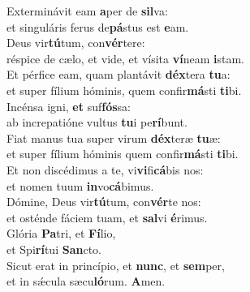 \evenverse Exterminávit eam \textbf{a}per de \textbf{sil}va:~\*\\
\evenverse et singuláris ferus de\textbf{pá}stus est \textbf{e}am.\\
\oddverse Deus vir\textbf{tú}tum, con\textbf{vér}tere:~\*\\
\oddverse réspice de cælo, et vide, et vísita \textbf{ví}neam \textbf{i}stam.\\
\evenverse Et pérfice eam, quam plantávit \textbf{déx}tera \textbf{tu}a:~\*\\
\evenverse et super fílium hóminis, quem confir\textbf{má}sti \textbf{ti}bi.\\
\oddverse Incénsa igni, \textbf{et} suf\textbf{fós}sa:~\*\\
\oddverse ab increpatióne vultus \textbf{tu}i pe\textbf{rí}bunt.\\
\evenverse Fiat manus tua super virum \textbf{déx}teræ \textbf{tu}æ:~\*\\
\evenverse et super fílium hóminis quem confir\textbf{má}sti \textbf{ti}bi.\\
\oddverse Et non discédimus a te, vi\textbf{vi}fi\textbf{cá}bis nos:~\*\\
\oddverse et nomen tuum \textbf{in}vo\textbf{cá}bimus.\\
\evenverse Dómine, Deus vir\textbf{tú}tum, con\textbf{vér}te nos:~\*\\
\evenverse et osténde fáciem tuam, et \textbf{sal}vi \textbf{é}rimus.\\
\oddverse Glória \textbf{Pa}tri, et \textbf{Fí}lio,~\*\\
\oddverse et Spi\textbf{rí}tui \textbf{San}cto.\\
\evenverse Sicut erat in princípio, et \textbf{nunc}, et \textbf{sem}per,~\*\\
\evenverse et in sǽcula sæcu\textbf{ló}rum. \textbf{A}men.\\

